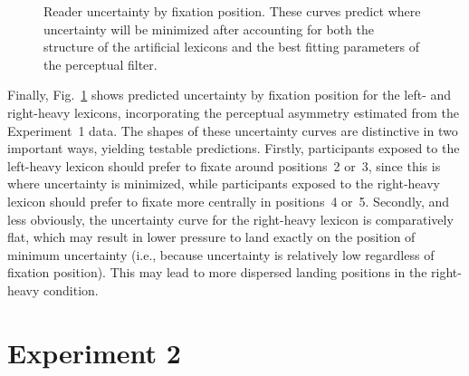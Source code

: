 \documentclass[doc,biblatex,floatsintext]{apa7}
\begin{document}
\begin{figure}
\vspace*{2pt}
\caption{Reader uncertainty by fixation position. These curves predict where uncertainty will be minimized after accounting for both the structure of the artificial lexicons and the best fitting parameters of the perceptual filter.}
\label{fig08}
\end{figure}

Finally, Fig.~\ref{fig08} shows predicted uncertainty by fixation position for the left- and right-heavy lexicons, incorporating the perceptual asymmetry estimated from the Experiment~1 data. The shapes of these uncertainty curves are distinctive in two important ways, yielding testable predictions. Firstly, participants exposed to the left-heavy lexicon should prefer to fixate around positions~2 or~3, since this is where uncertainty is minimized, while participants exposed to the right-heavy lexicon should prefer to fixate more centrally in positions~4 or~5. Secondly, and less obviously, the uncertainty curve for the right-heavy lexicon is comparatively flat, which may result in lower pressure to land exactly on the position of minimum uncertainty (i.e., because uncertainty is relatively low regardless of fixation position). This may lead to more dispersed landing positions in the right-heavy condition.

\section{Experiment 2}
\end{document}
